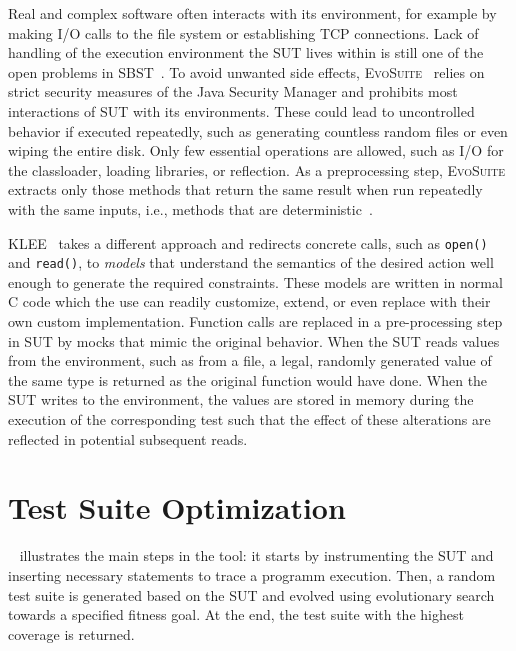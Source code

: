 \documentclass[paper=a4,%
  twoside,%
  BCOR4mm,%
  abstract=true,%
  toc=bibliography,%
  chapterprefix=true,%
  toc=bibliographynumbered,%
  open=right,%
  english,%
  pagesize=pdftex]{scrreprt}
\begin{document}
Real and complex software often interacts with its environment, for example by making I/O calls to the file system or establishing TCP connections. Lack of handling of the execution environment the \ac{SUT} lives within is still one of the open problems in \ac{SBST}~\cite{McMinn2011}. To avoid unwanted side effects, \textsc{EvoSuite}~\cite{Fraser2013a} relies on strict security measures of the Java Security Manager and prohibits most interactions of \ac{SUT} with its environments. These could lead to uncontrolled behavior if executed repeatedly, such as generating countless random files or even wiping the entire disk. Only few essential operations are allowed, such as I/O for the classloader, loading libraries, or reflection. As a preprocessing step, \textsc{EvoSuite} extracts only those methods that return the same result when run repeatedly with the same inputs, i.e., methods that are deterministic~\cite{Fraser2012}.

\textsc{KLEE}~\cite{cadar2008klee} takes a different approach and redirects concrete calls, such as \lstinline{open()} and \lstinline{read()}, to \textit{models} that understand the semantics of the desired action well enough to generate the required constraints. These models are written in normal C code which the use can readily customize, extend, or even replace with their own custom implementation. Function calls are replaced in a pre-processing step in \ac{SUT} by mocks that mimic the original behavior. When the \ac{SUT} reads values from the environment, such as from a file, a legal, randomly generated value of the same type is returned as the original function would have done. When the \ac{SUT} writes to the environment, the values are stored in memory during the execution of the corresponding test such that the effect of these alterations are reflected in potential subsequent reads.


\section{Test Suite Optimization}
~ illustrates the main steps in the tool: it starts by instrumenting the \ac{SUT} and inserting necessary statements to trace a programm execution. Then, a random test suite is generated based on the \ac{SUT} and evolved using evolutionary search towards a specified fitness goal. At the end, the test suite with the highest coverage is returned.
\end{document}

